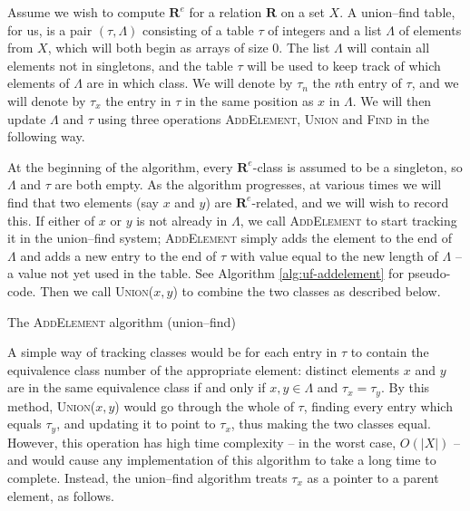 Assume we wish to compute $\mathbf{R}^e$ for a relation $\mathbf{R}$ on a set
$X$.  A union--find table, for us, is a pair $(\tau, \Lambda)$ consisting of a
table $\tau$ of integers and a list $\Lambda$ of elements from $X$, which will
both begin as arrays of size $0$.  The list $\Lambda$ will contain all elements
not in singletons, and the table $\tau$ will be used to keep track of which
elements of $\Lambda$ are in which class.  We will denote by $\tau_n$ the $n$th
entry of $\tau$, and we will denote by $\tau_x$ the entry in $\tau$ in the same
position as $x$ in $\Lambda$.  We will then update $\Lambda$ and $\tau$ using
three operations \textsc{AddElement}, \textsc{Union} and \textsc{Find} in the
following way.

At the beginning of the algorithm, every $\mathbf{R}^e$-class is assumed to be a
singleton, so $\Lambda$ and $\tau$ are both empty.  As the algorithm progresses,
at various times we will find that two elements (say $x$ and $y$) are
$\mathbf{R}^e$-related, and we will wish to record this.  If either of $x$ or
$y$ is not already in $\Lambda$, we call \textsc{AddElement} to start tracking
it in the union--find system; \textsc{AddElement} simply adds the element to the
end of $\Lambda$ and adds a new entry to the end of $\tau$ with value equal to
the new length of $\Lambda$ -- a value not yet used in the table.  See Algorithm
\ref{alg:uf-addelement} for pseudo-code.  Then we call \textsc{Union($x,y$)} to
combine the two classes as described below.

\begin{algorithm}
\caption{The \textsc{AddElement} algorithm (union--find)}
\label{alg:uf-addelement}
  \begin{algorithmic}
    \EndProcedure
  \end{algorithmic}
\end{algorithm}

A simple way of tracking classes would be for each entry in $\tau$ to contain
the equivalence class number of the appropriate element: distinct elements $x$
and $y$ are in the same equivalence class if and only if $x,y \in \Lambda$ and
$\tau_x = \tau_y$.  By this method, \textsc{Union($x,y$)} would go through the
whole of $\tau$, finding every entry which equals $\tau_y$, and updating it to
point to $\tau_x$, thus making the two classes equal.  However, this operation
has high time complexity -- in the worst case, $O(|X|)$ -- and would cause any
implementation of this algorithm to take a long time to complete.  Instead, the
union--find algorithm treats $\tau_x$ as a pointer to a parent element, as
follows.

